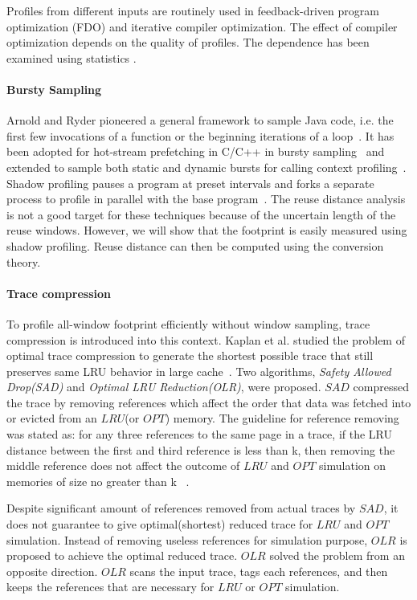 Profiles from different inputs are routinely used in feedback-driven
program optimization (FDO) and iterative compiler optimization.
The effect of compiler optimization depends on the quality of profiles.  The
dependence has been examined using statistics \citep{Chen+:PLDI10,Wu+:ECOOP13}.

\paragraph{Bursty Sampling}
Arnold and Ryder pioneered a general framework to sample Java code,
i.e. the first few invocations of a function or the beginning iterations of a
loop~\citep{ArnoldR:PLDI01}.  It has been adopted for hot-stream
prefetching in C/C++ in bursty sampling~\citep{ChilimbiH:PLDI02} and
extended to sample both static and dynamic bursts for calling context
profiling~\citep{Zhuang+:PLDI06}.  Shadow profiling pauses a program at
preset intervals and forks a separate process to profile in parallel
with the base program~\citep{Moseley+:CGO07,WallaceH:CGO07}. The 
reuse distance analysis is not a good target for these techniques because
of the uncertain length of the reuse windows.  However, we will
show that the footprint is easily measured using shadow profiling.
Reuse distance can then be computed using the conversion theory.


\paragraph{Trace compression} To profile all-window footprint
efficiently without window sampling, trace compression is introduced
into this context. 
Kaplan et al. studied the problem of optimal trace compression to generate the
shortest possible trace that still preserves same LRU behavior in
large cache~\citep{Kaplan+:TOMACS03}. Two algorithms, {\em Safety
  Allowed Drop(SAD)} and {\em Optimal LRU Reduction(OLR)}, were
proposed. $SAD$ compressed the trace by removing references which
affect the order that data was fetched 
into or evicted from an $LRU$(or $OPT$) memory. The guideline for 
reference removing was stated as: for any three references 
to the same page in a trace, if the LRU distance between the first and
third reference is less than k, then removing the middle reference 
does not affect the outcome of $LRU$ and $OPT$ simulation on memories 
of size no greater than k ~\citep{Kaplan+:TOMACS03}.

Despite significant amount of references removed from actual traces 
by $SAD$, it does not guarantee to give optimal(shortest) reduced 
trace for $LRU$ and $OPT$ simulation. Instead of removing
useless references for simulation purpose, $OLR$ is proposed to 
achieve the optimal reduced trace. $OLR$ solved the problem from 
an opposite direction. $OLR$ scans the input trace, tags each references,
and then keeps the references that are necessary for $LRU$ or 
$OPT$ simulation.

